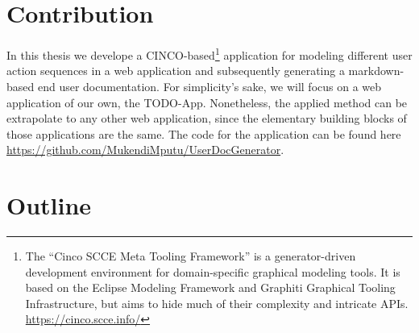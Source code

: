 \section{Contribution}
In this thesis we develope a CINCO-based\footnote{The “Cinco SCCE Meta Tooling Framework” is a generator-driven development environment for domain-specific graphical modeling tools. It is based on the Eclipse Modeling Framework and Graphiti Graphical Tooling Infrastructure, but aims to hide much of their complexity and intricate \glspl{API}. \url{https://cinco.scce.info/}} application for modeling different user action sequences in a web application and subsequently generating a markdown-based end user documentation. For simplicity's sake, we will focus on a web application of our own, the TODO-App. Nonetheless, the applied method can be extrapolate to any other web application, since the elementary building blocks of those applications are the same. The code for the application can be found here \url{https://github.com/MukendiMputu/UserDocGenerator}. 
\section{Outline}